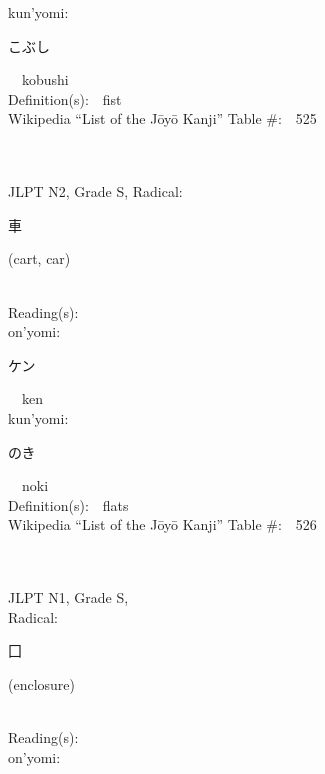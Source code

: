 \begin{multicols}{2}
{\hspace*{1em}}kun'yomi:\ \ \\
{\hspace*{2em}}{\begin{CJK}{UTF8}{min} こぶし \end{CJK}}\ \ kobushi\ \ \\
Definition(s):\ \ fist \\
Wikipedia ``List of the J\=oy\=o Kanji'' Table \#:\ \ 525 \\
\ \ \\
{\fontsize{34pt}{40pt}  }\ \ \\  %
{JLPT N2, Grade S, Radical:\ \ {\begin{CJK}{UTF8}{min} 車 \end{CJK}} (cart, car) } \\
Reading(s):\ \ \\
{\hspace*{1em}}on'yomi:\ \ \\
{\hspace*{2em}}{\begin{CJK}{UTF8}{min} ケン \end{CJK}}\ \ ken\ \ \\
{\hspace*{1em}}kun'yomi:\ \ \\
{\hspace*{2em}}{\begin{CJK}{UTF8}{min} のき \end{CJK}}\ \ noki\ \ \\
Definition(s):\ \ flats \\
Wikipedia ``List of the J\=oy\=o Kanji'' Table \#:\ \ 526 \\
\ \ \\
{\fontsize{34pt}{40pt}  }\ \ \\
{JLPT N1, Grade S, \\Radical:\ \ {\begin{CJK}{UTF8}{min} 囗 \end{CJK}} (enclosure) } \\
Reading(s):\ \ \\
{\hspace*{1em}}on'yomi:\ \ \\

\end{multicols}
